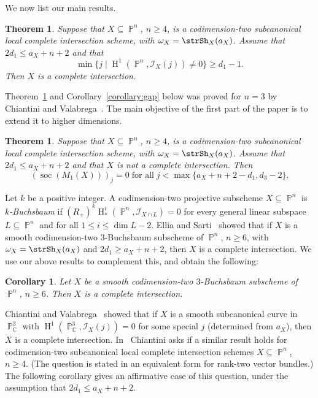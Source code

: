 \documentclass[11pt,a4paper]{amsart}
\theoremstyle{plain}
\newtheorem{theorem}[equation]{Theorem}
\newtheorem{corollary}[equation]{Corollary}
\theoremstyle{definition}
\newcommand{\calI}{\mathcal I}
\newcommand{\complex}{\mathbb{C}}
\DeclareMathOperator{\projective}{\mathbb{P}}
\DeclareMathOperator{\homology}{H}
\newcommand{\define}[1]{\emph{#1}}
\DeclareMathOperator{\socle}{soc}
\begin{document}
We now list our main results.

\begin{theorem}
\label{theorem:minHOne}
Suppose that $X \subseteq \projective^n$, $n \geq 4$,
is a codimension-two subcanonical
local complete intersection scheme, with $\omega_X = \strSh_X(a_X)$.
Assume that $2d_1 \leq a_X+n+2$ and that
\[
\min\{j \mid \homology^1(\projective^n, \calI_X(j ) ) \neq 0 \} \geq d_1-1.
\]
Then $X$ is a complete intersection.
\end{theorem}

Theorem~\ref{theorem:minHOne} and Corollary~\ref{corollary:gap} below  was
proved for $n=3$ by Chiantini and
Valabrega~\cite[Theorem~6 and
Corollary~7]{ChiantiniVallabregaSubcanCurves1987}. 
The main objective of the first part of the paper is to extend it to higher
dimensions.

\begin{theorem}
\label{theorem:CIorNegSocZero}
Suppose that $X \subseteq \projective^n$, $n \geq 4$,
is a codimension-two subcanonical
local complete intersection scheme, with $\omega_X = \strSh_X(a_X)$.
Assume that $2d_1 \leq a_X+n+2$ and that $X$ is not a complete intersection.
Then 
\[
(\socle(M_1(X)))_j = 0
\;\text{for all}\;
j < \max \{ a_X+n+2-d_1, d_3-2\}.
\]
\end{theorem}

Let $k$ be a positive integer.
A codimension-two projective subscheme $X \subseteq \projective^n$ is
\define{$k$-Buchsbaum} if 
$(R_+)^k\homology^i_*(\projective^n, \calI_{X \cap L}) = 0$
for every general linear subspace $L \subseteq \projective^n$
and for all $1 \leq i \leq \dim L-2$.
Ellia and Sarti~\cite [Proposition~13]{ElliaSartikBuchs1999} showed that if
$X$ is a smooth codimension-two $3$-Buchsbaum
subscheme of $\projective^n$, $n \geq 6$, with $\omega_X = \strSh_X(a_X )$
and $2d_1 \geq a_X + n + 2$, then $X$ is a complete intersection.
We use our above results to complement this, and obtain the following:

\begin{corollary}
\label{corollary:3Buchs}
Let $X$ be a smooth codimension-two $3$-Buchsbaum
subscheme of $\projective^n$, $n \geq 6$. 
Then $X$ is a complete intersection.
\end{corollary}

Chiantini and 
Valabrega~\cite[Theorems~1.3, 1.6]{ChiantiniVallabregaSubcanCurves1983}
showed that if $X$ is a smooth subcanonical curve in
$\projective^3_\complex$ with 
$\homology^1(\projective^3_\complex, \calI_X(j)) = 0$ for some
special $j$ (determined from $a_X$), then $X$ is a complete intersection.
In~\cite[p.~388]{ChiantiniVBReflShLowCodimVars2006}
Chiantini asks if a similar result holds for codimension-two subcanonical
local complete intersection schemes 
$X \subseteq \projective^n$, $n \geq 4$.
(The question is stated in an equivalent form for rank-two vector bundles.)
The following corollary gives an affirmative case of this question,
under the assumption that $2d_1 \leq a_X+n+2$.
\end{document}

